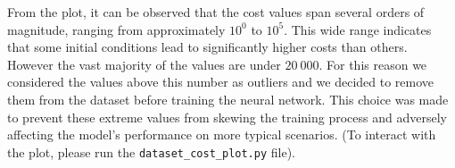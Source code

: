 \noindent From the plot, it can be observed that the cost values span several orders of magnitude, ranging from approximately $10^0$ to $10^5$. This wide range indicates that some initial conditions lead to significantly higher costs than others. However the vast majority of the values are under $20\ 000$. For this reason we considered the values above this number as outliers and we decided to remove them from the dataset before training the neural network. This choice was made to prevent these extreme values from skewing the training process and adversely affecting the model's performance on more typical scenarios. (To interact with the plot, please run the \texttt{dataset\_cost\_plot.py} file).